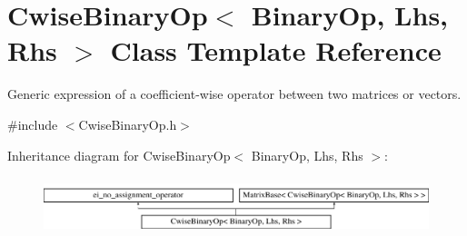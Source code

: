 \hypertarget{class_cwise_binary_op}{\section{Cwise\-Binary\-Op$<$ Binary\-Op, Lhs, Rhs $>$ Class Template Reference}
\label{class_cwise_binary_op}
}


Generic expression of a coefficient-\/wise operator between two matrices or vectors.  




{\ttfamily \#include $<$Cwise\-Binary\-Op.\-h$>$}

Inheritance diagram for Cwise\-Binary\-Op$<$ Binary\-Op, Lhs, Rhs $>$\-:\begin{figure}[H]
\begin{center}
\leavevmode
\includegraphics[height=1.686747cm]{class_cwise_binary_op}
\end{center}
\end{figure}
